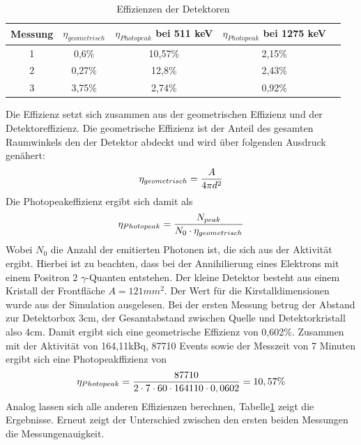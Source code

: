 \documentclass[a4paper,11pt,twoside]{article}
\begin{document}
\begin{table}
\begin{center}
    \caption{Effizienzen der Detektoren}
    \label{l4}
    \begin{tabular}[c]{|c|c|c|c|c|}
    \hline
    Messung & $\eta_{geometrisch}$&$\eta_{Photopeak}$ bei 511 keV &$\eta_{Photopeak}$ bei 1275 keV \\\hline 
     1 & 0,6\% & 10,57\%&2,15\%\\\hline
     2 & 0,27\% & 12,8\%&2,43\%\\\hline
     3 &3,75\% & 2,74\%&0,92\%\\\hline
     
    
    \hline
    \end{tabular}
\end{center}
\end{table}
Die Effizienz setzt sich zusammen aus der geometrischen Effizienz und der Detektoreffizienz. Die geometrische Effizienz ist der Anteil des gesamten Raumwinkels den der Detektor abdeckt und wird über folgenden Ausdruck genähert:
\begin{equation}
\eta_{geometrisch}={A\over 4 \pi d^2}
\end{equation}
Die Photopeakeffizienz ergibt sich damit als
\begin{equation}
\eta_{Photopeak}={N_{peak}\over N_0\cdot\eta_{geometrisch}}
\end{equation}
Wobei $N_0$ die Anzahl der emitierten Photonen ist, die sich aus der Aktivität ergibt. Hierbei ist zu beachten, dass bei der Annihilierung eines Elektrons mit einem Positron 2 $\gamma$-Quanten entstehen. Der kleine Detektor besteht aus einem Kristall der Frontfläche $A=121mm^2$. Der Wert für die Kirstalldimensionen wurde aus der Simulation ausgelesen. Bei der ersten Messung betrug der Abstand zur Detektorbox 3cm, der Gesamtabstand zwischen Quelle und Detektorkristall also 4cm. Damit ergibt sich eine geometrische Effizienz von 0,602\%. Zusammen mit der Aktivität von 164,11kBq, 87710 Events sowie der Messzeit von 7 Minuten ergibt sich eine Photopeakffizienz von
\begin{equation}
\eta_{Photopeak}={87710\over 2\cdot7\cdot60\cdot164110\cdot0,0602}=10,57\%
\end{equation}
Analog lassen sich alle anderen Effizienzen berechnen, Tabelle\ref{l4} zeigt die Ergebnisse. Erneut zeigt der Unterschied zwischen den ersten beiden Messungen die Messungenauigkeit.
%
%
%
%
\end{document}
